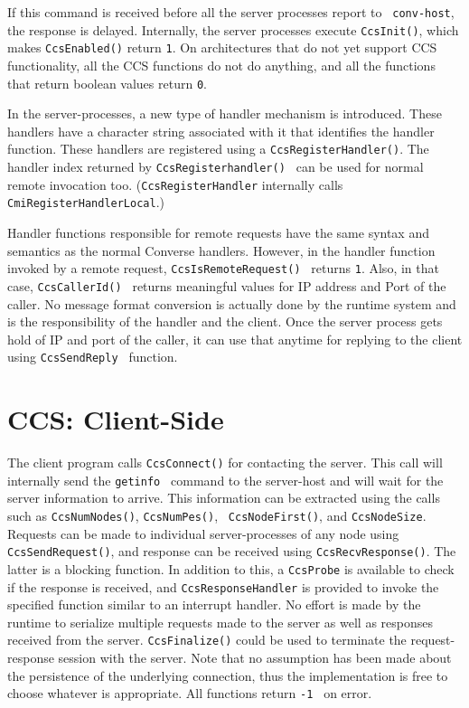 If this command is received before all the server processes report to {\tt
conv-host}, the response is delayed. Internally, the server processes execute
{\tt CcsInit()}, which makes {\tt CcsEnabled()} return {\tt  1}. On
architectures that do not yet support CCS functionality, all the CCS functions
do not do anything, and all the functions that return boolean values return
{\tt  0}.

In the server-processes, a new type of handler mechanism is introduced. These
handlers have a character string associated with it that identifies the handler
function. These handlers are registered using a {\tt  CcsRegisterHandler()}.
The handler index returned by {\tt  CcsRegisterhandler() } can be used for
normal remote invocation too. ({\tt CcsRegisterHandler} internally calls 
{\tt CmiRegisterHandlerLocal}.)

Handler functions responsible for remote requests have the same syntax and
semantics as the normal Converse handlers. However, in the handler function
invoked by a remote request, {\tt CcsIsRemoteRequest() } returns {\tt  1}.
Also, in that case, {\tt  CcsCallerId() } returns meaningful values for IP
address and Port of the caller. No message format conversion is actually done
by the runtime system and is the responsibility of the handler and the client.
Once the server process gets hold of IP and port of the caller, it can use that
anytime for replying to the client using {\tt  CcsSendReply } function.


\section{CCS: Client-Side}

The client program calls {\tt  CcsConnect()} for contacting the server. This
call will internally send the {\tt getinfo } command to the server-host and
will wait for the server information to arrive. This information can be
extracted using the calls such as {\tt  CcsNumNodes()}, {\tt CcsNumPes()}, {\tt
CcsNodeFirst()}, and {\tt CcsNodeSize}. Requests can be made to individual
server-processes of any node using {\tt CcsSendRequest()}, and response can be
received using {\tt CcsRecvResponse()}. The latter is a blocking function. In
addition to this, a {\tt CcsProbe} is available to check if the response is
received, and {\tt CcsResponseHandler} is provided to invoke the specified
function similar to an interrupt handler. No effort is made by the runtime to
serialize multiple requests made to the server as well as responses received
from the server. {\tt CcsFinalize()} could be used to terminate the
request-response session with the server. Note that no assumption has been made
about the persistence of the underlying connection, thus the implementation is
free to choose whatever is appropriate. All functions return {\tt  -1 } on
error.

